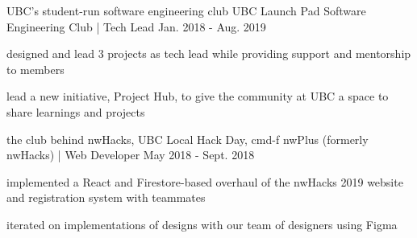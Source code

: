 \begin{cventries}

  \cventry
    {UBC's student-run software engineering club} %
    {UBC Launch Pad Software Engineering Club | Tech Lead} %
    {} %
    {Jan. 2018 - Aug. 2019} %
    {
      \begin{cvitems} %
        \item {designed and lead 3 projects as tech lead while providing support and mentorship to members}
        \item {lead a new initiative, Project Hub, to give the community at UBC a space to share learnings and projects}
      \end{cvitems}
    }

  \cventry
    {the club behind nwHacks, UBC Local Hack Day, cmd-f} %
    {nwPlus (formerly nwHacks) | Web Developer} %
    {} %
    {May 2018 - Sept. 2018} %
    {
      \begin{cvitems} %
        \item {implemented a React and Firestore-based overhaul of the nwHacks 2019 website and registration system with teammates}
        \item {iterated on implementations of designs with our team of designers using Figma}
      \end{cvitems}
    }

\end{cventries}
